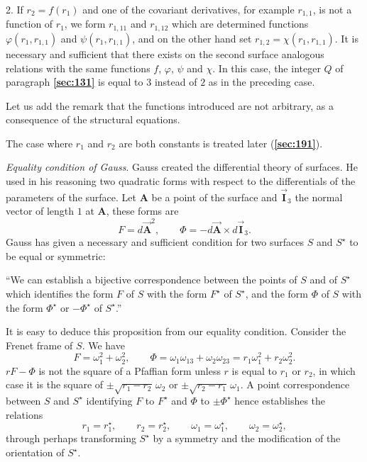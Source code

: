 \documentclass[leqno,11pt]{book}
\makeatletter
\numberwithin{equation}{chapter}
\theoremstyle{shape1}
\theoremstyle{shapesmall}
\let\old@phi\phi
\let\old@varphi\varphi
\let\phi\old@varphi
\let\varphi\old@phi
\newcommand{\fsref}[1]{{\rm\textsection\textbf{\ref{sec:#1}}}}
\newcommand{\str}{^{\star}}
\newcommand{\rvec}[1]{\vec{\mathbf{#1}}}
\newcommand{\ivec}{\rvec{I}}
\newcommand{\somespace}{\vspace{9pt}}
\makeatother
\begin{document}
2. If $r_{2}=f(r_{1})$ and one of the covariant derivatives, for example $r_{1,1}$, is not a function of $r_{1}$, we form $r_{1,11}$ and $r_{1,12}$ which are determined functions $\phi(r_{1},r_{1,1})$ and $\psi(r_{1},r_{1,1})$, and on the other hand set $r_{1,2}=\chi(r_{1},r_{1,1})$. It is necessary and sufficient that there exists on the second surface analogous relations with the same functions $f$, $\phi$, $\psi$ and $\chi$. In this case, the integer $Q$ of paragraph \fsref{131} is equal to $3$ instead of $2$ as in the preceding case.

\somespace

Let us add the remark that the functions introduced are not arbitrary, as a consequence of the structural equations.

The case where $r_{1}$ and $r_{2}$ are both constants is treated later (\fsref{191}).

\somespace

\emph{Equality condition of Gauss}. Gauss created the differential theory of surfaces. He used in his reasoning two quadratic forms with respect to the differentials of the parameters of the surface. Let $\mathbf{A}$ be a point of the surface and $\ivec_{3}$ the normal vector of length $1$ at $\mathbf{A}$, these forms are
\[
F=d\vec{\mathbf{A}}^{2},\qquad\Phi=-d\vec{\mathbf{A}}\times d\ivec_{3}.
\]
Gauss has given a necessary and sufficient condition for two surfaces $S$ and $S\str$ to be equal or symmetric:

\somespace

``We can establish a bijective correspondence between the points of $S$ and of $S\str$ which identifies the form $F$ of $S$ with the form $F\str$ of $S\str$, and the form $\Phi$ of $S$ with the form $\Phi\str$ or $-\Phi\str$ of $S\str$.''

\somespace

It is easy to deduce this proposition from our equality condition. Consider the Frenet frame of $S$. We have
\[
F=\omega_{1}^{2}+\omega_{2}^{2},\qquad\Phi=\omega_{1}\omega_{13}+\omega_{2}\omega_{23}=r_{1}\omega_{1}^{2}+r_{2}\omega_{2}^{2}.
\]
$rF-\Phi$ is not the square of a Pfaffian form unless $r$ is equal to $r_{1}$ or $r_{2}$, in which case it is the square of $\pm\sqrt{r_{1}-r_{2}}\,\omega_{2}$ or $\pm\sqrt{r_{2}-r_{1}}\,\omega_{1}$. A point correspondence between $S$ and $S\str$ identifying $F$ to $F\str$ and $\Phi$ to $\pm\Phi\str$ hence establishes the relations
\begin{equation}
  \label{eq:12.29}
  r_{1}=r_{1}\str,\qquad r_{2}=r\str_{2},\qquad\omega_{1}=\omega_{1}\str,\qquad\omega_{2}=\omega_{2}\str,
\end{equation}
through perhaps transforming $S\str$ by a symmetry and the modification of the orientation of $S\str$.
\end{document}
